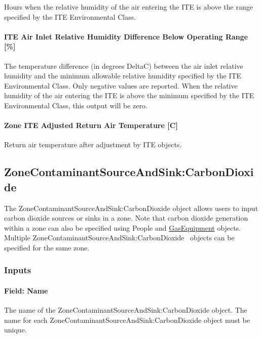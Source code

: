Hours when the relative humidity of the air entering the ITE is above the range specified by the ITE Environmental Class.

\paragraph{ITE Air Inlet Relative Humidity Difference Below Operating Range {[}\%{]}}\label{ite-air-inlet-relative-humidity-difference-below-operating-range}

The temperature difference (in degrees DeltaC) between the air inlet relative humidity and the minimum allowable relative humidity specified by the ITE Environmental Class. Only negative values are reported. When the relative humidity of the air entering the ITE is above the minimum specified by the ITE Environmental Class, this output will be zero.

\paragraph{Zone ITE Adjusted Return Air Temperature [C]}

Return air temperature after adjustment by ITE objects.

\subsection{ZoneContaminantSourceAndSink:CarbonDioxide}\label{zonecontaminantsourceandsinkcarbondioxide}

The ZoneContaminantSourceAndSink:CarbonDioxide object allows users to input carbon dioxide sources or sinks in a zone. Note that carbon dioxide generation within a zone can also be specified using People and \hyperref[gasequipment]{GasEquipment} objects. Multiple ZoneContaminantSourceAndSink:CarbonDioxide~ objects can be specified for the same zone.

\subsubsection{Inputs}\label{inputs-10-008}

\paragraph{Field: Name}\label{field-name-10-007}

The name of the ZoneContaminantSourceAndSink:CarbonDioxide object. The name for each ZoneContaminantSourceAndSink:CarbonDioxide object must be unique.

